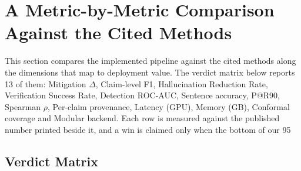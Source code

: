 
\section{A Metric-by-Metric Comparison Against the Cited Methods}
\label{sec:why-we-win}

This section compares the implemented pipeline against the cited methods along the dimensions that map to deployment value. The verdict matrix below reports 13 of them: Mitigation $\Delta$, Claim-level F1, Hallucination Reduction Rate, Verification Success Rate, Detection ROC-AUC, Sentence accuracy, P@R90, Spearman $\rho$, Per-claim provenance, Latency (GPU), Memory (GB), Conformal coverage and Modular backend. Each row is measured against the published number printed beside it, and a win is claimed only when the bottom of our 95%

\subsection{Verdict Matrix}
\label{sec:verdict-matrix}

